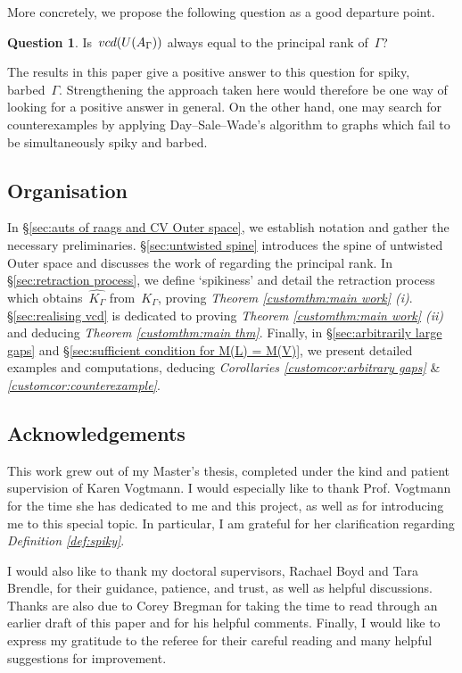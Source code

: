 \documentclass[11pt]{amsart}
\theoremstyle{definition}
\theoremstyle{definition}
\theoremstyle{definition}
\theoremstyle{definition}
\newtheorem*{question*}{Question}
\newcommand{\vcduag}{\textsc{vcd}(U(A_{\Gamma}))} %
\newcommand{\spine}{K_{\Gamma}} %
\newcommand{\res}{\widehat{K_\Gamma}} %
\begin{document}
More concretely, we propose the following question as a good departure point. 
\begin{question*}
    Is~$\vcduag$ always equal to the principal rank of~$\Gamma$?
\end{question*}
The results in this paper give a positive answer to this question for spiky, barbed~$\Gamma$. Strengthening the approach taken here would therefore be one way of looking for a positive answer in general. On the other hand, one may search for counterexamples by applying Day--Sale--Wade's algorithm to graphs which fail to be simultaneously spiky and barbed.

\subsection*{Organisation}

In \S\ref{sec:auts of raags and CV Outer space}, we establish notation and gather the necessary preliminaries. \S\ref{sec:untwisted spine} introduces the spine of untwisted Outer space and discusses the work of \cite{MillardVogtmannCubeComplexes21} regarding the principal rank. In \S\ref{sec:retraction process}, we define `spikiness' and detail the retraction process which obtains~$\res$ from~$\spine$, proving \textit{Theorem \ref{customthm:main work} (i)}. \S\ref{sec:realising vcd} is dedicated to proving \textit{Theorem \ref{customthm:main work} (ii)} and deducing \textit{Theorem \ref{customthm:main thm}}. Finally, in \S\ref{sec:arbitrarily large gaps} and \S\ref{sec:sufficient condition for M(L) = M(V)}, we present detailed examples and computations, deducing \textit{Corollaries \ref{customcor:arbitrary gaps}} \& \textit{\ref{customcor:counterexample}}.

\subsection*{Acknowledgements}

This work grew out of my Master's thesis, completed under the kind and patient supervision of Karen Vogtmann. I would especially like to thank Prof. Vogtmann for the time she has dedicated to me and this project, as well as for introducing me to this special topic. In particular, I am grateful for her clarification regarding \emph{Definition \ref{def:spiky}}.

I would also like to thank my doctoral supervisors, Rachael Boyd and Tara Brendle, for their guidance, patience, and trust, as well as helpful discussions. Thanks are also due to Corey Bregman for taking the time to read through an earlier draft of this paper and for his helpful comments. Finally, I would like to express my gratitude to the referee for their careful reading and many helpful suggestions for improvement.
\end{document}
